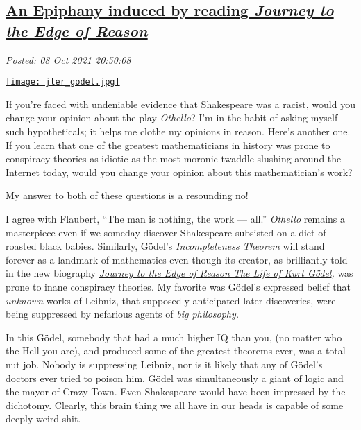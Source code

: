 %

\subsection*{\href{http://analyzethedatanotthedrivel.org/2021/10/08/an-epiphany-induced-by-reading-journey-to-the-edge-of-reason/}{An Epiphany induced by reading \emph{Journey to the Edge of Reason}}}


\noindent\emph{Posted: 08 Oct 2021 20:50:08}
\vspace{6pt}

\captionsetup[floatingfigure]{labelformat=empty}
\begin{floatingfigure}[r]{0.23\textwidth}
\centering
\href{https://www.goodreads.com/book/show/55298400-journey-to-the-edge-of-reason}{\texttt{[image: jter\_godel.jpg]}}
\caption[Journey to the Edge of Reason The Life of Kurt Gödel]{}
\label{fig:7238x0}
\end{floatingfigure}
If you're faced with undeniable evidence that Shakespeare was a racist,
would you change your opinion about the play \emph{Othello}? I'm in the
habit of asking myself such hypotheticals; it helps me clothe my
opinions in reason. Here's another one. If you learn that one of the
greatest mathematicians in history was prone to conspiracy theories as
idiotic as the most moronic twaddle slushing around the Internet today,
would you change your opinion about this mathematician's work?

My answer to both of these questions is a resounding no!

I agree with Flaubert, ``The man is nothing, the work --- all.''
\emph{Othello} remains a masterpiece even if we someday discover
Shakespeare subsisted on a diet of roasted black babies. Similarly,
Gödel's \emph{Incompleteness Theorem} will stand forever as a landmark
of mathematics even though its creator, as brilliantly told in the new
biography
\href{https://www.goodreads.com/book/show/55298400-journey-to-the-edge-of-reason}{\emph{Journey
to the Edge of Reason The Life of Kurt Gödel}}\emph{,} was prone to
inane conspiracy theories. My favorite was Gödel's expressed belief that
\emph{unknown} works of Leibniz, that supposedly anticipated
later discoveries, were being suppressed by nefarious agents of
\emph{big philosophy.}

In this Gödel, somebody that had a much higher IQ than you, (no matter
who the Hell you are), and produced some of the greatest theorems ever,
was a total nut job. Nobody is suppressing Leibniz, nor is it likely
that any of Gödel's doctors ever tried to poison him. Gödel was
simultaneously a giant of logic and the mayor of Crazy Town. Even
Shakespeare would have been impressed by the dichotomy. Clearly, this
brain thing we all have in our heads is capable of some deeply weird
shit.


